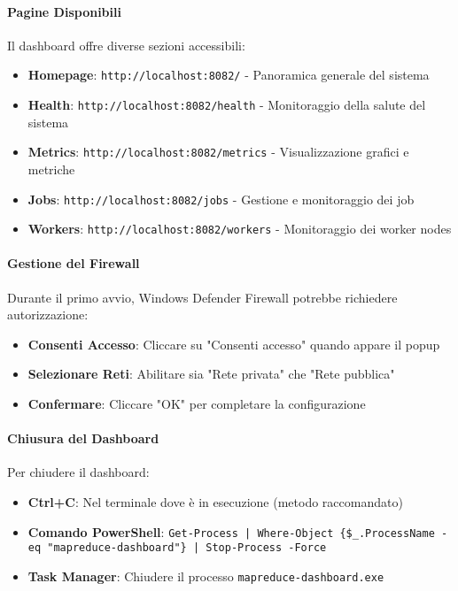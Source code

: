 \documentclass[12pt,a4paper]{article}
\begin{document}
\paragraph{Pagine Disponibili}
Il dashboard offre diverse sezioni accessibili:

\begin{itemize}
\item \textbf{Homepage}: \texttt{http://localhost:8082/} - Panoramica generale del sistema
\item \textbf{Health}: \texttt{http://localhost:8082/health} - Monitoraggio della salute del sistema
\item \textbf{Metrics}: \texttt{http://localhost:8082/metrics} - Visualizzazione grafici e metriche
\item \textbf{Jobs}: \texttt{http://localhost:8082/jobs} - Gestione e monitoraggio dei job
\item \textbf{Workers}: \texttt{http://localhost:8082/workers} - Monitoraggio dei worker nodes
\end{itemize}

\paragraph{Gestione del Firewall}
Durante il primo avvio, Windows Defender Firewall potrebbe richiedere autorizzazione:

\begin{itemize}
\item \textbf{Consenti Accesso}: Cliccare su "Consenti accesso" quando appare il popup
\item \textbf{Selezionare Reti}: Abilitare sia "Rete privata" che "Rete pubblica"
\item \textbf{Confermare}: Cliccare "OK" per completare la configurazione
\end{itemize}

\paragraph{Chiusura del Dashboard}
Per chiudere il dashboard:

\begin{itemize}
\item \textbf{Ctrl+C}: Nel terminale dove è in esecuzione (metodo raccomandato)
\item \textbf{Comando PowerShell}: \texttt{Get-Process | Where-Object \{\$_.ProcessName -eq "mapreduce-dashboard"\} | Stop-Process -Force}
\item \textbf{Task Manager}: Chiudere il processo \texttt{mapreduce-dashboard.exe}
\end{itemize}
\end{document}
